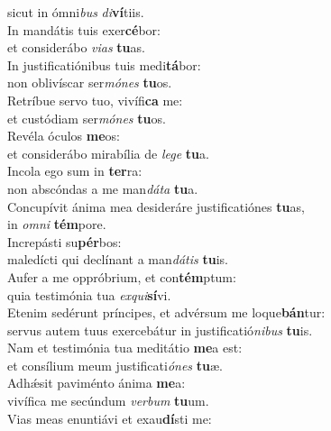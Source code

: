 \evenverse sicut in ómni\textit{bus} \textit{di}\textbf{ví}tiis.\\
\oddverse In mandátis tuis exer\textbf{cé}bor:~\*\\
\oddverse et considerábo \textit{vi}\textit{as} \textbf{tu}as.\\
\evenverse In justificatiónibus tuis medi\textbf{tá}bor:~\*\\
\evenverse non oblivíscar ser\textit{mó}\textit{nes} \textbf{tu}os.\\
\oddverse Retríbue servo tuo, vivífi\textbf{ca} me:~\*\\
\oddverse et custódiam ser\textit{mó}\textit{nes} \textbf{tu}os.\\
\evenverse Revéla óculos \textbf{me}os:~\*\\
\evenverse et considerábo mirabília de \textit{le}\textit{ge} \textbf{tu}a.\\
\oddverse Incola ego sum in \textbf{ter}ra:~\*\\
\oddverse non abscóndas a me man\textit{dá}\textit{ta} \textbf{tu}a.\\
\evenverse Concupívit ánima mea desideráre justificatiónes \textbf{tu}as,~\*\\
\evenverse in \textit{om}\textit{ni} \textbf{tém}pore.\\
\oddverse Increpásti su\textbf{pér}bos:~\*\\
\oddverse maledícti qui declínant a man\textit{dá}\textit{tis} \textbf{tu}is.\\
\evenverse Aufer a me oppróbrium, et con\textbf{tém}ptum:~\*\\
\evenverse quia testimónia tua \textit{ex}\textit{qui}\textbf{sí}vi.\\
\oddverse Etenim sedérunt príncipes, et advérsum me loque\textbf{bán}tur:~\*\\
\oddverse servus autem tuus exercebátur in justificatió\textit{ni}\textit{bus} \textbf{tu}is.\\
\evenverse Nam et testimónia tua meditátio \textbf{me}a est:~\*\\
\evenverse et consílium meum justificati\textit{ó}\textit{nes} \textbf{tu}æ.\\
\oddverse Adhǽsit paviménto ánima \textbf{me}a:~\*\\
\oddverse vivífica me secúndum \textit{ver}\textit{bum} \textbf{tu}um.\\
\evenverse Vias meas enuntiávi et exau\textbf{dí}sti me:~\*\\

